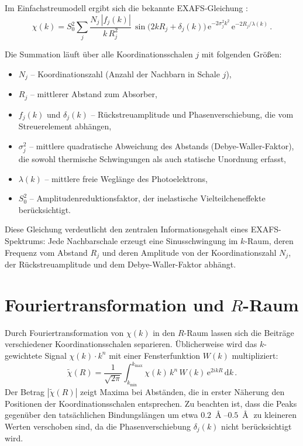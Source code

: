 Im Einfachstreumodell ergibt sich die bekannte EXAFS-Gleichung
\cite{Stern1974, Sayers1971}:
\begin{equation}
  \chi(k) = S_0^2 \sum_j \frac{N_j\,|f_j(k)|}{k\,R_j^2}\,
    \sin\!\bigl(2kR_j + \delta_j(k)\bigr)\,
    \mathrm{e}^{-2\sigma_j^2 k^2}\,
    \mathrm{e}^{-2R_j/\lambda(k)}\,.
  \label{eq:exafs}
\end{equation}

Die Summation läuft über alle Koordinationsschalen $j$ mit folgenden Größen:
\begin{itemize}[nosep]
  \item $N_j$ -- Koordinationszahl (Anzahl der Nachbarn in Schale $j$),
  \item $R_j$ -- mittlerer Abstand zum Absorber,
  \item $f_j(k)$ und $\delta_j(k)$ -- Rückstreuamplitude und
        Phasenverschiebung, die vom Streuerelement abhängen,
  \item $\sigma_j^2$ -- mittlere quadratische Abweichung des Abstands
        (Debye-Waller-Faktor), die sowohl thermische Schwingungen als auch
        statische Unordnung erfasst,
  \item $\lambda(k)$ -- mittlere freie Weglänge des Photoelektrons,
  \item $S_0^2$ -- Amplitudenreduktionsfaktor, der inelastische
        Vielteilcheneffekte berücksichtigt.
\end{itemize}

Diese Gleichung verdeutlicht den zentralen Informationsgehalt eines
EXAFS-Spektrums: Jede Nachbarschale erzeugt eine Sinusschwingung im
$k$-Raum, deren Frequenz vom Abstand $R_j$ und deren Amplitude von der
Koordinationszahl $N_j$, der Rückstreuamplitude und dem
Debye-Waller-Faktor abhängt.

\section{Fouriertransformation und $R$-Raum}

Durch Fouriertransformation von $\chi(k)$ in den $R$-Raum lassen sich
die Beiträge verschiedener Koordinationsschalen separieren.
Üblicherweise wird das $k$-gewichtete Signal $\chi(k)\cdot k^n$ mit
einer Fensterfunktion $W(k)$ multipliziert:
\begin{equation}
  \tilde{\chi}(R) = \frac{1}{\sqrt{2\pi}}
    \int_{k_{\min}}^{k_{\max}} \chi(k)\,k^n\,W(k)\,
    \mathrm{e}^{2ikR}\,\mathrm{d}k\,.
  \label{eq:ft}
\end{equation}
Der Betrag $|\tilde{\chi}(R)|$ zeigt Maxima bei Abständen, die in erster
Näherung den Positionen der Koordinationsschalen entsprechen.
Zu beachten ist, dass die Peaks gegenüber den tatsächlichen
Bindungslängen um etwa
$\SIrange{0.2}{0.5}{\Angstrom}$ zu kleineren Werten verschoben sind,
da die Phasenverschiebung $\delta_j(k)$ nicht berücksichtigt wird.

